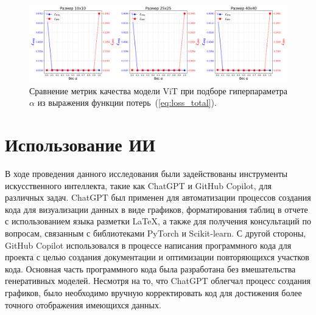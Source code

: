 \documentclass[a4paper,12pt]{extarticle}
\begin{document}
\begin{figure}[ht]
    \centering
    \includegraphics[width=1.0\textwidth]{graphics/exp3_alpha_std_extra.png}
    \caption{Сравнение метрик качества модели \textsf{ViT} при подборе гиперпараметра $\alpha$ из выражения функции потерь~(\ref{eq:loss_total}).}
    \label{graph:alpha_extra}
\end{figure}

\newpage
\section{Использование ИИ}

В ходе проведения данного исследования были задействованы инструменты искусственного интеллекта, такие как ChatGPT и GitHub Copilot, для различных задач. ChatGPT был применен для автоматизации процессов создания кода для визуализации данных в виде графиков, форматирования таблиц в отчете с использованием языка разметки LaTeX, а также для получения консультаций по вопросам, связанным с библиотеками PyTorch и Scikit-learn. С другой стороны, GitHub Copilot использовался в процессе написания программного кода для проекта с целью создания документации и оптимизации повторяющихся участков кода. Основная часть программного кода была разработана без вмешательства генеративных моделей. Несмотря на то, что ChatGPT облегчал процесс создания графиков, было необходимо вручную корректировать код для достижения более точного отображения имеющихся данных.
\end{document}
